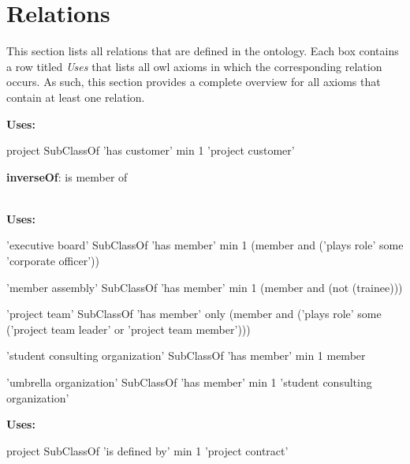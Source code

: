 \documentclass[a4paper, DIV=13, BCOR=0cm]{scrbook}
\begin{document}
\section{Relations}
This section lists all relations that are defined in the ontology. Each box contains a row titled \textit{Uses} that lists all \gls{owl} axioms in which the corresponding relation occurs. As such, this section provides a complete overview for all axioms that contain at least one relation.

\begin{mdframed}[style=onto, frametitle={has customer}]
	{%
		\textbf{Uses:}
		\begin{compactitem}
			\item project SubClassOf 'has customer' min 1 'project customer'
		\end{compactitem}
	} %
\end{mdframed}

\begin{mdframed}[style=onto, frametitle={has member}]
	{%
		\begin{compactitem}
			\item \textbf{inverseOf}: is member of
		\end{compactitem}
		\hrulefill\\
		\textbf{Uses:}
		\begin{compactitem}
			\item 'executive board' SubClassOf 'has member' min 1 (member and ('plays role' some 'corporate officer'))
			\item 'member assembly' SubClassOf 'has member' min 1 (member and (not (trainee)))
			\item 'project team' SubClassOf 'has member' only 
			(member and ('plays role' some 
			('project team leader' or 'project team member')))
			\item 'student consulting organization' SubClassOf 'has member' min 1 member
			\item 'umbrella organization' SubClassOf 'has member' min 1 'student consulting organization'
		\end{compactitem}
	} %
\end{mdframed}

\begin{mdframed}[style=onto, frametitle={is defined by}]
	{%
		\textbf{Uses:}
		\begin{compactitem}
			\item project SubClassOf 'is defined by' min 1 'project contract'
		\end{compactitem}
	} %
\end{mdframed}
\end{document}

